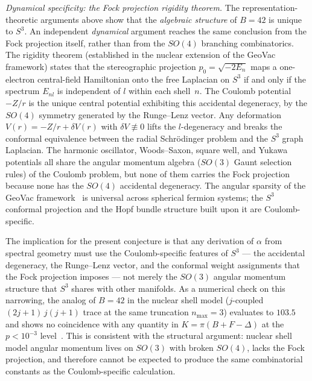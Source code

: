 \documentclass[aps,prl,twocolumn,superscriptaddress]{revtex4-2}
\begin{document}
\textit{Dynamical specificity: the Fock projection rigidity theorem.}
The representation-theoretic arguments above show that the
\textit{algebraic structure} of $B = 42$ is unique to $S^3$. An
independent \textit{dynamical} argument reaches the same conclusion
from the Fock projection itself, rather than from the $SO(4)$
branching combinatorics. The rigidity theorem (established in the
nuclear extension of the GeoVac framework) states that the
stereographic projection $p_0 = \sqrt{-2 E_n}$ maps a one-electron
central-field Hamiltonian onto the free Laplacian on $S^3$ if and
only if the spectrum $E_{nl}$ is independent of $l$ within each
shell~$n$. The Coulomb potential $-Z/r$ is the unique central
potential exhibiting this accidental degeneracy, by the $SO(4)$
symmetry generated by the Runge--Lenz vector. Any deformation
$V(r) = -Z/r + \delta V(r)$ with $\delta V \not\equiv 0$ lifts the
$l$-degeneracy and breaks the conformal equivalence between the
radial Schr\"odinger problem and the $S^3$ graph Laplacian.
The harmonic oscillator, Woods--Saxon, square well, and Yukawa
potentials all share the angular momentum algebra ($SO(3)$ Gaunt
selection rules) of the Coulomb problem, but none of them carries
the Fock projection because none has the $SO(4)$ accidental
degeneracy. The angular sparsity of the GeoVac
framework~\cite{paper22_sparsity} is universal across spherical
fermion systems; the $S^3$ conformal projection and the Hopf bundle
structure built upon it are Coulomb-specific.

The implication for the present conjecture is that any derivation of
$\alpha$ from spectral geometry must use the Coulomb-specific
features of $S^3$ --- the accidental degeneracy, the Runge--Lenz
vector, and the conformal weight assignments that the Fock projection
imposes --- not merely the $SO(3)$ angular momentum structure that
$S^3$ shares with other manifolds. As a numerical check on this
narrowing, the analog of $B = 42$ in the nuclear shell model
($j$-coupled $(2j+1)\,j(j+1)$ trace at the same truncation
$n_{\max} = 3$) evaluates to $103.5$ and shows no coincidence with
any quantity in $K = \pi(B + F - \Delta)$ at the $p < 10^{-3}$
level~\cite{track_nj_alpha_memo}. This is consistent with the
structural argument: nuclear shell model angular momentum lives on
$SO(3)$ with broken $SO(4)$, lacks the Fock projection, and
therefore cannot be expected to produce the same combinatorial
constants as the Coulomb-specific calculation.
\end{document}
